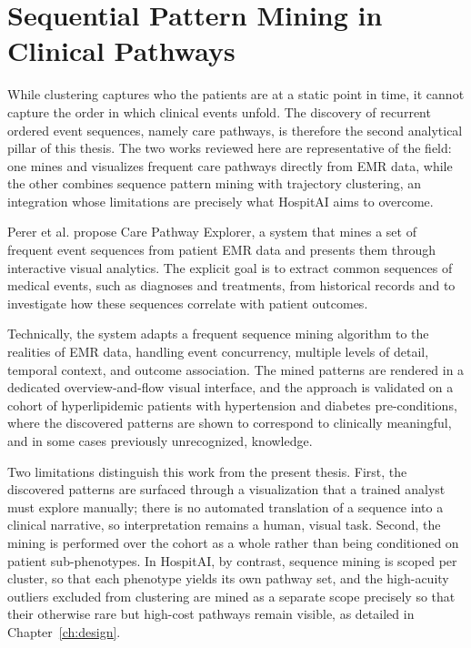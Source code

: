 \section{Sequential Pattern Mining in Clinical Pathways}\label{sec:rw_sequences}

While clustering captures who the patients are at a static point in time, it cannot capture the order in which clinical events unfold. The discovery of recurrent ordered event sequences, namely care pathways, is therefore the second analytical pillar of this thesis. The two works reviewed here are representative of the field: one mines and visualizes frequent care pathways directly from EMR data, while the other combines sequence pattern mining with trajectory clustering, an integration whose limitations are precisely what HospitAI aims to overcome.

Perer et al. \cite{perer2015} propose Care Pathway Explorer, a system that mines a set of frequent event sequences from patient EMR data and presents them through interactive visual analytics. The explicit goal is to extract common sequences of medical events, such as diagnoses and treatments, from historical records and to investigate how these sequences correlate with patient outcomes.

Technically, the system adapts a frequent sequence mining algorithm to the realities of EMR data, handling event concurrency, multiple levels of detail, temporal context, and outcome association. The mined patterns are rendered in a dedicated overview-and-flow visual interface, and the approach is validated on a cohort of hyperlipidemic patients with hypertension and diabetes pre-conditions, where the discovered patterns are shown to correspond to clinically meaningful, and in some cases previously unrecognized, knowledge.

Two limitations distinguish this work from the present thesis. First, the discovered patterns are surfaced through a visualization that a trained analyst must explore manually; there is no automated translation of a sequence into a clinical narrative, so interpretation remains a human, visual task. Second, the mining is performed over the cohort as a whole rather than being conditioned on patient sub-phenotypes. In HospitAI, by contrast, sequence mining is scoped per cluster, so that each phenotype yields its own pathway set, and the high-acuity outliers excluded from clustering are mined as a separate scope precisely so that their otherwise rare but high-cost pathways remain visible, as detailed in Chapter~\ref{ch:design}.

